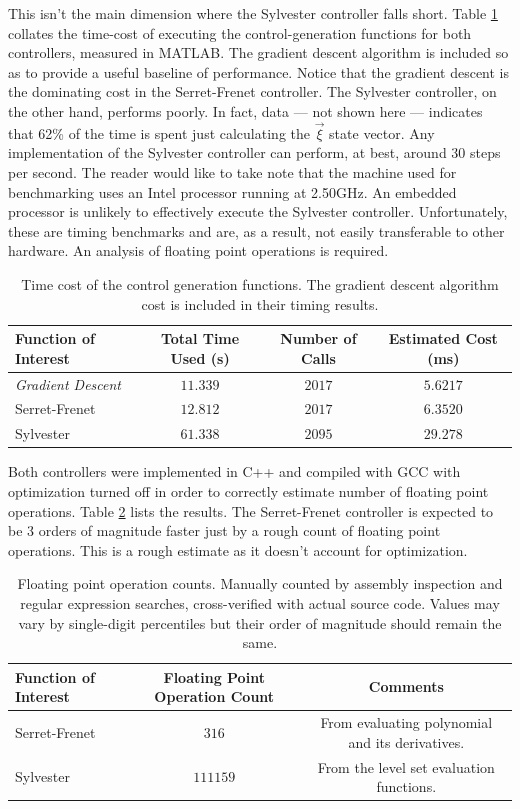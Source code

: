 \documentclass[oneside, 11pt]{book}
\begin{document}
This isn't the main dimension where the Sylvester controller falls short. Table \ref{tab:perf_simple} collates the time-cost of executing the control-generation functions for both controllers, measured in MATLAB. The gradient descent algorithm is included so as to provide a useful baseline of performance. Notice that the gradient descent is the dominating cost in the Serret-Frenet controller. The Sylvester controller, on the other hand, performs poorly. In fact, data --- not shown here --- indicates that 62\% of the time is spent just calculating the $\vec{\xi}$ state vector. Any implementation of the Sylvester controller can perform, at best, around 30 steps per second. The reader would like to take note that the machine used for benchmarking uses an Intel processor running at 2.50GHz. An embedded processor is unlikely to effectively execute the Sylvester controller. Unfortunately, these are timing benchmarks and are, as a result, not easily transferable to other hardware. An analysis of floating point operations is required.
\begin{table}[!htbp]
    \centering
    \begin{tabular}{l|c|c|c}
        Function of Interest & Total Time Used (s) & Number of Calls & Estimated Cost (ms) \\ \hline
        \emph{Gradient Descent} & $11.339$ & $2017$ & $5.6217$\\ \hline
        Serret-Frenet & $12.812$ & $2017$ & $6.3520$ \\ \hline
        Sylvester & $61.338$ & $2095$ & $29.278$
    \end{tabular}
    \caption{Time cost of the control generation functions. The gradient descent algorithm cost is included in their timing results.}
    \label{tab:perf_simple}
\end{table}

Both controllers were implemented in C++ and compiled with GCC with optimization turned off in order to correctly estimate number of floating point operations. Table \ref{tab:perf_flop} lists the results. The Serret-Frenet controller is expected to be 3 orders of magnitude faster just by a rough count of floating point operations. This is a rough estimate as it doesn't account for optimization.

\begin{table}[!htbp]
    \centering
    \begin{tabular}{l|c|c}
        Function of Interest & Floating Point Operation Count & Comments\\ \hline
        Serret-Frenet & $316$ & From evaluating polynomial and its derivatives.\\  \hline
        Sylvester & $111159$ & From the level set evaluation functions.
    \end{tabular}
    \caption{Floating point operation counts. Manually counted by assembly inspection and regular expression searches, cross-verified with actual source code. Values may vary by single-digit percentiles but their order of magnitude should remain the same.}
    \label{tab:perf_flop}
\end{table}
\end{document}
